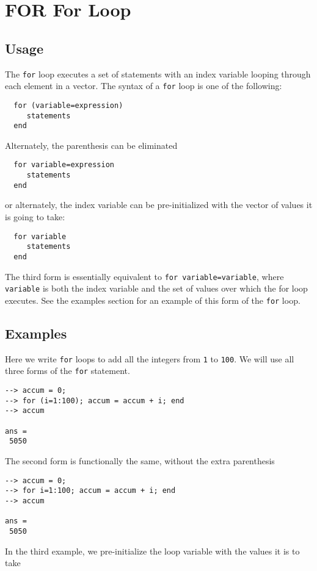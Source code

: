 \section{FOR For Loop}

\subsection{Usage}

The \verb|for| loop executes a set of statements with an 
index variable looping through each element in a vector.
The syntax of a \verb|for| loop is one of the following:
\begin{verbatim}
  for (variable=expression)
     statements
  end
\end{verbatim}
Alternately, the parenthesis can be eliminated
\begin{verbatim}
  for variable=expression
     statements
  end
\end{verbatim}
or alternately, the index variable can be pre-initialized
with the vector of values it is going to take:
\begin{verbatim}
  for variable
     statements
  end
\end{verbatim}
The third form is essentially equivalent to \verb|for variable=variable|,
where \verb|variable| is both the index variable and the set of values
over which the for loop executes.  See the examples section for
an example of this form of the \verb|for| loop.
\subsection{Examples}

Here we write \verb|for| loops to add all the integers from
\verb|1| to \verb|100|.  We will use all three forms of the \verb|for|
statement.
\begin{verbatim}
--> accum = 0;
--> for (i=1:100); accum = accum + i; end
--> accum

ans = 
 5050 
\end{verbatim}
The second form is functionally the same, without the
extra parenthesis
\begin{verbatim}
--> accum = 0;
--> for i=1:100; accum = accum + i; end
--> accum

ans = 
 5050 
\end{verbatim}
In the third example, we pre-initialize the loop variable
with the values it is to take
\begin{verbatim}

\end{verbatim}
